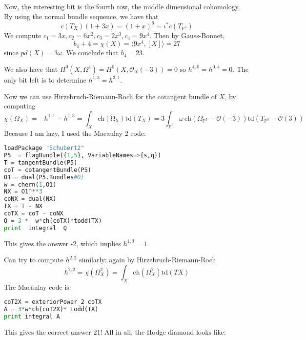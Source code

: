 Now, the interesting bit is the fourth row, the middle dimensional cohomology. By using the normal bundle sequence, we have that $$c(T_{X})(1+3x)=(1+x)^6=\iota^* c(T_{\mathbb{P}^5})$$We compute $c_1=3x, c_2=6x^2, c_3=2x^3, c_4=9x^4$. Then by Gauss-Bonnet, $$b_{4}+4=\chi(X)=\langle 9x^4, [X] \rangle= 27 $$since $pd(X)=3\omega$. We conclude that $b_4=23$. 

We also have that $H^0(X, \Omega^4)=H^0(X, \mathcal{O}_{X}(-3))=0$ so $h^{4,0}=h^{0,4}=0$. The only bit left is to determine $h^{1,3}=h^{3,1}$. 

Now we can use Hirzebruch-Riemann-Roch for the cotangent bundle of $X$, by computing $$\chi(\Omega_{X})=-h^{1,1}-h^{1,3}=\int _{X}\mathrm{ch(\Omega_{X})}\mathrm{td}(T_{X})=3\int _{\mathbb{P}^5} \omega \,\mathrm{ch}(\Omega_{\mathbb{P}^5}-\mathcal{O}(-3)) \mathrm{td}(T_{\mathbb{P}^5}-\mathcal{O}(3))  $$
Because I am lazy, I used the Macaulay 2 code: 

\begin{lstlisting}[language=Python]
loadPackage "Schubert2"
P5  = flagBundle({1,5}, VariableNames=>{s,q})
T = tangentBundle(P5)
coT = cotangentBundle(P5)
O1 = dual(P5.Bundles#0)
w = chern(1,O1)
NX = O1^**3
coNX = dual(NX)
TX = T - NX
coTX = coT - coNX
Q = 3 *  w*ch(coTX)*todd(TX)
print  integral  Q
\end{lstlisting}
This gives the answer -2, which implies $h^{1,3}=1$.

Can try to compute $h^{2,2}$ similarly: again by Hirzebruch-Riemann-Roch
$$h^{2,2}=\chi(\Omega_{X}^2)=\int_{X} \mathrm{ch}(\Omega^2_{X})\mathrm{td}(TX)  $$
The Macaulay code is: 

\begin{lstlisting}[language=Python] 
coT2X = exteriorPower_2 coTX
A = 3*w*ch(coT2X)* todd(TX)
print integral A
\end{lstlisting}
This gives the correct answer $21$! All in all, the Hodge diamond looks like: 

\begin{center}
\end{center}


